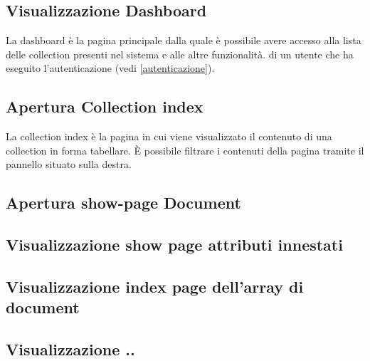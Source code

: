 	\subsection{Visualizzazione Dashboard} %
	\label{visualizzazionedashboard}
	La dashboard è la pagina principale dalla quale è possibile avere accesso alla lista delle collection presenti nel sistema e alle altre funzionalità.
	di un utente che ha eseguito l'autenticazione (vedi \ref{autenticazione}).
	

	\subsection{Apertura Collection index} %
	\label{aprturacollectionindex}
	La collection index è la pagina in cui viene visualizzato il contenuto di una collection in forma tabellare. \`E possibile filtrare i contenuti della pagina tramite il pannello situato sulla destra.

	\subsection{Apertura show-page Document} %

	\subsection{Visualizzazione show page attributi innestati} %

	\subsection{Visualizzazione index page dell'array di document} %




	





	\subsection{Visualizzazione ..}
	
